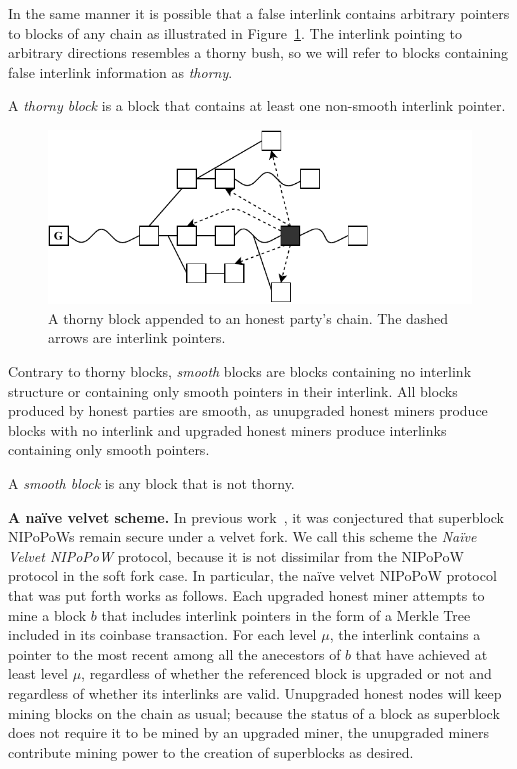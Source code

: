 In the same manner it is possible that a false interlink contains arbitrary pointers to blocks of any chain as illustrated in Figure~\ref{fig:thorny_block}. The interlink pointing to arbitrary directions resembles a thorny bush, so we will refer to blocks containing false interlink information as \emph{thorny}.

\begin{definition}
	A \emph{thorny block} is a block that contains at least one non-smooth interlink pointer.
	\label{defn:thorny_block}
\end{definition}

\begin{figure}[h]
	\begin{center}
		\includegraphics[width=0.9\columnwidth]{figures/thorny_block.pdf}
	\end{center}
	\caption{A thorny block appended to an honest party's chain.
	The dashed arrows are interlink pointers.}
	\label{fig:thorny_block}
\end{figure}

Contrary to thorny blocks, \emph{smooth} blocks are blocks containing no interlink structure or containing only smooth pointers in their interlink. All blocks produced by honest parties are smooth, as unupgraded honest miners produce blocks with no interlink and upgraded honest miners produce interlinks containing only smooth pointers.

\begin{definition}
	A \emph{smooth block} is any block that is not thorny.
	\label{defn:smooth_block}
\end{definition}

\noindent
\textbf{A na\"ive velvet scheme.}
In previous work~\cite{nipopows}, it was conjectured that superblock NIPoPoWs
remain secure under a velvet fork. We call this scheme the \emph{Na\"ive Velvet
NIPoPoW} protocol, because it is not dissimilar from the NIPoPoW protocol in the
soft fork case. In particular, the na\"ive velvet NIPoPoW protocol that was put
forth works as follows. Each upgraded honest miner attempts to mine a block $b$
that includes interlink pointers in the form of a Merkle Tree included in its
coinbase transaction. For each level $\mu$, the interlink contains a pointer to
the most recent among all the anecestors of $b$ that have achieved at least
level $\mu$, regardless of whether the referenced block is upgraded or not and
regardless of whether its interlinks are valid. Unupgraded honest nodes will
keep mining blocks on the chain as usual; because the status of a block as
superblock does not require it to be mined by an upgraded miner, the unupgraded
miners contribute mining power to the creation of superblocks as desired.

